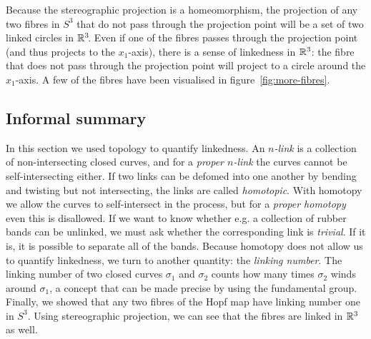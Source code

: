 \begin{figure}
\begin{center}
\end{center}
\end{figure}

Because the stereographic projection is a homeomorphism,
the projection of any two fibres in $S^3$ that do not pass through the projection point
will be a set of two linked circles in $\mathbb{R}^3\!$.
Even if one of the fibres passes through the projection point
(and thus projects to the $x_1$-axis),
there is a sense of linkedness in $\mathbb{R}^3$:
the fibre that does not pass through the projection point
will project to a circle around the $x_1$-axis.
A few of the fibres have been visualised in figure~\ref{fig:more-fibres}.

\subsection*{Informal summary}
In this section we used topology to quantify linkedness.
An \emph{$n$-link} is a collection of non-intersecting closed curves,
and for a \emph{proper $n$-link} the curves cannot be self-intersecting either.
If two links can be defomed into one another by bending and twisting but not intersecting,
the links are called \emph{homotopic}.
With homotopy we allow the curves to self-intersect in the process,
but for a \emph{proper homotopy} even this is disallowed.
If we want to know whether e.g. a collection of rubber bands can be unlinked,
we must ask whether the corresponding link is \emph{trivial}.
If it is, it is possible to separate all of the bands.
Because homotopy does not allow us to quantify linkedness,
we turn to another quantity: the \emph{linking number}.
The linking number of two closed curves $\sigma_1$ and $\sigma_2$
counts how many times $\sigma_2$ winds around $\sigma_1$,
a concept that can be made precise by using the fundamental group.
Finally, we showed that any two fibres of the Hopf map have linking number one in $S^3\!$.
Using stereographic projection,
we can see that the fibres are linked in $\mathbb{R}^3$ as well.
